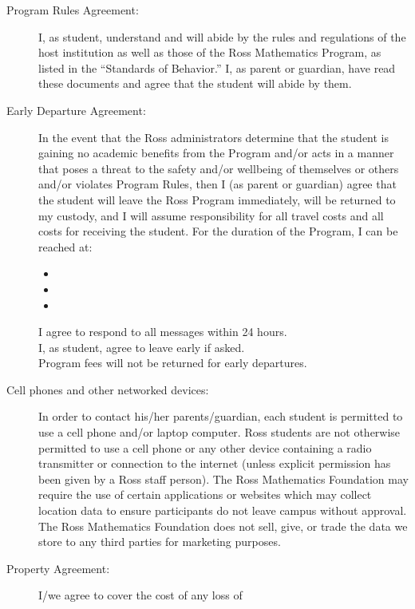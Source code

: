\documentclass{ross}
\begin{document}
\begin{description}
\item[Program Rules Agreement:] I, as student, understand and will
  abide by the rules and regulations of the host institution as
  well as those of the Ross Mathematics Program, as listed in the
  ``Standards of Behavior.'' I, as parent or guardian, have read
  these documents and agree that the student will abide by them.
\item[Early Departure Agreement:] In the event that the Ross
  administrators determine that the student is gaining no academic
  benefits from the Program and/or acts in a manner that poses a
  threat to the safety and/or wellbeing of themselves or others and/or
  violates Program Rules, then I (as parent or guardian) agree that
  the student will leave the Ross Program immediately, will be
  returned to my custody, and I will assume responsibility for all
  travel costs and all costs for receiving the student.
  For the duration of the Program, I can be reached at:
  \begin{itemize}
    \item \genblank[email]{\phantom{\hspace{2in}}} 
    \item \genblank[phone]{\phantom{\hspace{2in}}} 
    \item {} 
  \end{itemize}
  I agree to respond to all messages within 24 hours. \\[1ex]
  I, as student, agree to leave early if asked.  \\
Program fees will not be returned for early departures.
\item[Cell phones and other networked devices:] In order to contact
his/her parents/guardian, each student is permitted to use a cell
phone and/or laptop computer. Ross students are not otherwise
permitted to use a cell phone or any other device containing a radio
transmitter or connection to the internet (unless explicit permission has been given by a Ross staff person). The Ross Mathematics
Foundation may require the use of certain applications or websites
which may collect location data to ensure participants do not leave
campus without approval.  The Ross Mathematics Foundation does not
sell, give, or trade the data we store to any third parties for
marketing purposes.
\item[Property Agreement:] I/we agree to cover the cost of any loss of

\end{description}
\end{document}

